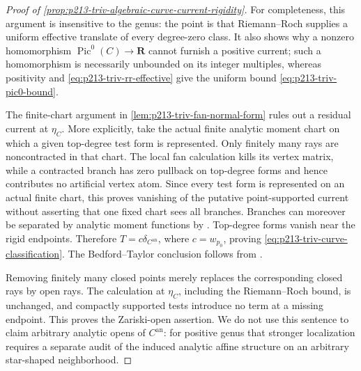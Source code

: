 \begin{proof}[Proof of
\cref{prop:p213-triv-algebraic-curve-current-rigidity}]
For completeness, this argument is insensitive to the genus: the point is
that Riemann--Roch supplies a uniform effective translate of every
degree-zero class.  It also shows why a nonzero homomorphism
\(\operatorname{Pic}^0(C)\to\mathbf R\) cannot furnish a positive current;
such a homomorphism is necessarily unbounded on its integer multiples,
whereas positivity and \eqref{eq:p213-triv-rr-effective} give the uniform
bound \eqref{eq:p213-triv-pic0-bound}.

The finite-chart argument in
\cref{lem:p213-triv-fan-normal-form} rules out a residual current at
\(\eta_C\).  More explicitly, take the actual finite analytic moment chart
on which a given top-degree test form is represented.  Only finitely many
rays are noncontracted in that chart.  The local fan calculation kills its
vertex matrix, while a contracted branch has zero pullback on top-degree
forms and hence contributes no artificial vertex atom.  Since every test
form is represented on an actual finite chart, this proves vanishing of the
putative point-supported current without asserting that one fixed chart
sees all branches.  Branches can moreover be separated by analytic moment
functions by
\cite[Lemma~3.3.6 and Theorem~4.2.5]{Ducros24CurveStructure}.
Top-degree forms vanish near the rigid endpoints.  Therefore
\(T=c\delta_{C^{\mathrm{an}}}\), where \(c=w_{p_0}\), proving
\eqref{eq:p213-triv-curve-classification}.  The Bedford--Taylor conclusion
follows from \cite[Example~8.6.4]{CLD25}.

Removing finitely many closed points merely replaces the corresponding
closed rays by open rays.  The calculation at \(\eta_C\), including the
Riemann--Roch bound, is unchanged, and compactly supported tests introduce
no term at a missing endpoint.  This proves the Zariski-open assertion.
We do not use this sentence to claim arbitrary analytic opens of
\(C^{\mathrm{an}}\): for positive genus that stronger localization requires
a separate audit of the induced analytic affine structure on an arbitrary
star-shaped neighborhood.
\end{proof}

